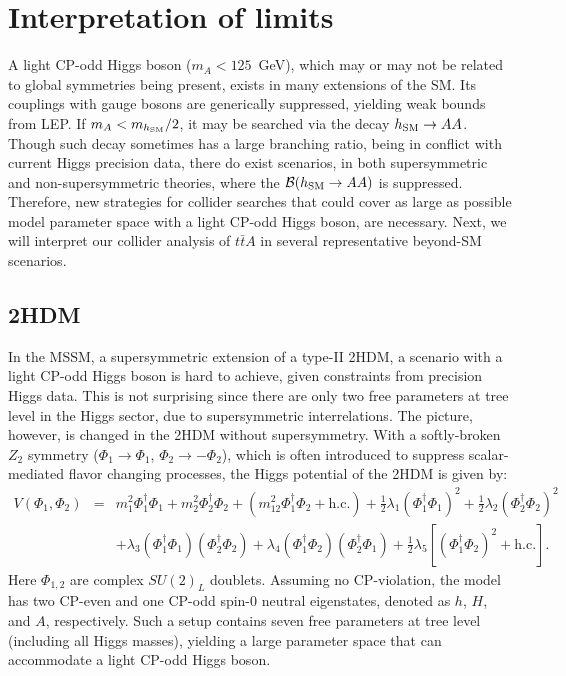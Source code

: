\documentclass[preprintnumbers,superscriptaddress,nofootinbib,aps,prd,floatfix]{revtex4}
\begin{document}
\section{Interpretation of limits}
\label{sec:interpretation}

A light CP-odd Higgs boson ($m_A < 125$~GeV), which may or may not be related to global symmetries being present, exists in many extensions of the SM. Its couplings with gauge bosons are generically suppressed, yielding weak bounds from LEP. If $m_A<m_{h_{\rm SM}}/2$, it may be searched via the 
decay $h_{\rm SM} \to AA$. Though such decay sometimes has a large branching ratio, being in conflict with current Higgs precision data, there do exist scenarios, in both supersymmetric and non-supersymmetric theories, where the ${\cal B}(h_{\rm SM}\to AA)$ is suppressed. 
Therefore, new strategies for collider searches that could cover as large as possible model parameter space with a light CP-odd Higgs boson, are necessary. 
Next, we will interpret our collider analysis of $t\bar t A$ in several representative beyond-SM scenarios. 

\subsection{2HDM}

In the MSSM, a supersymmetric extension of a type-II 2HDM, a scenario with a light CP-odd Higgs boson is hard to achieve, given constraints from precision Higgs data. This is not surprising since there are only two free parameters at tree level in the Higgs sector, due to supersymmetric interrelations. The picture, however, is changed in the 2HDM without supersymmetry. With a softly-broken $Z_2$ symmetry ($\Phi_1 \to \Phi_1$, $\Phi_2 \to -\Phi_2$), which is often introduced to suppress scalar-mediated flavor changing processes, the Higgs potential of the 2HDM is given by: 
\begin{eqnarray} 
V(\Phi_1,\Phi_2) &=& m^2_1 \Phi^{\dagger}_1\Phi_1+m^2_2
\Phi^{\dagger}_2\Phi_2 + (m^2_{12} \Phi^{\dagger}_1\Phi_2+{\mathrm{h.c.}
}) +\frac{1}{2} \lambda_1 (\Phi^{\dagger}_1\Phi_1)^2 +\frac{1}{2}
\lambda_2 (\Phi^{\dagger}_2\Phi_2)^2\nonumber \\ 
&& +\lambda_3
(\Phi^{\dagger}_1\Phi_1)(\Phi^{\dagger}_2\Phi_2) + \lambda_4
(\Phi^{\dagger}_1\Phi_2)(\Phi^{\dagger}_2\Phi_1) + \frac{1}{2}
\lambda_5[(\Phi^{\dagger}_1\Phi_2)^2+{\mathrm{h.c.}}].
\end{eqnarray}
Here $\Phi_{1,2}$ are complex $SU(2)_L$ doublets. Assuming no CP-violation, the model has two CP-even and one CP-odd spin-0 neutral eigenstates, denoted as $h$, $H$, and $A$, respectively. Such a setup contains seven free parameters at tree level (including all Higgs masses), yielding a large parameter space that can accommodate a light CP-odd Higgs boson. 
\end{document}
